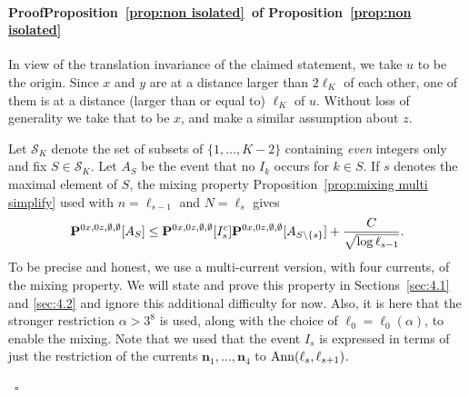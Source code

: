 \documentclass[a4paper,oneside,11pt]{article}
\newcommand{\be}[1]{\begin{equation}\label{#1}}
\newcommand{\ee}{\end{equation}}
\numberwithin{equation}{section}
\numberwithin{equation}{section}
\numberwithin{equation}{section}
\newenvironment{proof}[1][\relax]%
  {\paragraph{Proof\ifx#1\relax\else~of #1\fi}}%
  {~\hfill$\square$\par\bigskip}
\newcommand{\calS}{\mathcal{S}}
\def\be{\begin{equation}}
\def\ee{\end{equation}}
\newcommand{\n}{\mathbf{n}}
\begin{document}
\begin{proof}[Proposition~\ref{prop:non isolated}]  In view of the translation invariance of the claimed statement, we take $u$ to be the origin. Since $x$ and $y$ are at a distance larger than $2\ell_K$ of each other, one of them is at a distance (larger than or equal to) $\ell_K$ of $u$.  Without loss of generality we take that to be $x$, and make a similar assumption about $z$.

Let $\calS_K$ denote the set of subsets of $\{1,\dots,K-2\}$ containing {\em even} integers only and fix  $S\in \calS_K$. Let $A_S$ be the event that no $I_k$ occurs for $k\in S$. If $s$ denotes the maximal element of $S$, the mixing property Proposition~\ref{prop:mixing multi simplify} used with $n=\ell_{s-1}$ and $N=\ell_{s}$ gives
\be
{\bf P}^{0x,0z,\emptyset,\emptyset}[A_S]\le {\bf P}^{0x,0z,\emptyset,\emptyset}[I_s^c]{\bf P}^{0x,0z,\emptyset,\emptyset}[A_{S\setminus\{s\}}]+\frac{C}{\sqrt{\log \ell_{s-1}}}.
\ee
To be precise and honest, we use a multi-current version, with four currents, of the mixing property. We will state and prove this property in Sections~\ref{sec:4.1} and \ref{sec:4.2} and ignore this additional difficulty for now. Also,
it is here that the stronger restriction $\alpha>3^8$ is used, along with the choice of  $\ell_0=\ell_0(\alpha)$,  to enable the mixing.  Note that we used that the event $I_s$ is expressed in terms of just the restriction of the currents $\n_1,\dots,\n_4$ to ${\rm Ann}(\ell_s,\ell_{s+1})$. 


\end{proof}
\end{document}

